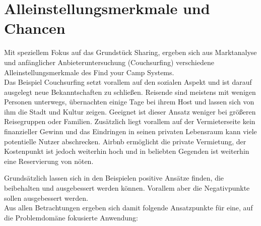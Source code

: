 

\section{Alleinstellungsmerkmale und Chancen}
Mit speziellem Fokus auf das Grundstück Sharing, ergeben sich aus Marktanalyse und anfänglicher Anbieteruntersuchung (Couchsurfing) verschiedene Alleinstellungsmerkmale des Find your Camp Systems.\\

Das Beispiel Couchsurfing setzt vorallem auf den sozialen Aspekt und ist darauf ausgelegt neue Bekanntschaften zu schließen. Reisende sind meistens mit wenigen Personen unterwegs, übernachten einige Tage bei ihrem Host und lassen sich von ihm die Stadt und Kultur zeigen.
Geeignet ist dieser Ansatz weniger bei größeren Reisegruppen oder Familien. Zusätzlich liegt vorallem auf der Vermieterseite kein finanzieller Gewinn und das Eindringen in seinen privaten Lebensraum kann viele potentielle Nutzer abschrecken.
Airbnb ermöglicht die private Vermietung, der Kostenpunkt ist jedoch weiterhin hoch und in beliebten Gegenden ist weiterhin eine Reservierung von nöten. 

Grundsätzlich lassen sich in den Beispielen positive Ansätze finden, die beibehalten und ausgebessert werden können. Vorallem aber die Negativpunkte sollen ausgebessert werden.\\ Aus allen Betrachtungen ergeben sich damit folgende Ansatzpunkte für eine, auf die Problemdomäne fokusierte Anwendung:\\


